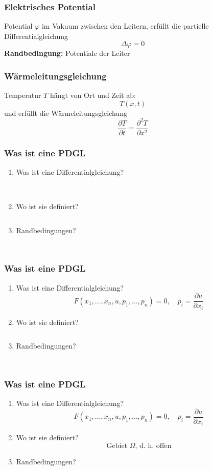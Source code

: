 \begin{frame}
\frametitle{Elektrisches Potential}
Potential 
$\varphi$ 
im Vakuum zwischen den Leitern,
\pause
erfüllt die partielle Differentialgleichung
\[
\Delta \varphi =0
\]
\pause
{\bf Randbedingung:} Potentiale der Leiter
\end{frame}

\begin{frame}
\frametitle{Wärmeleitungsgleichung}
Temperatur $T$ hängt von Ort und Zeit ab:
\[
T(x,t)
\]
\pause
und erfüllt die Wärmeleitungsgleichung
\[
\frac{\partial T}{\partial t}=\frac{\partial^2T}{\partial x^2}
\]
\end{frame}

\begin{frame}
\frametitle{Was ist eine PDGL}
\begin{enumerate}
\item Was ist eine Differentialgleichung?
\[
\phantom{
F( x_1,\dots,x_n,u,p_1, \dots,p_n) =0,\quad p_i=\frac{\partial u}{\partial x_i}
}
\]
\item Wo ist sie definiert?
\[
\phantom{
\text{Gebiet $\Omega$, d.~h.~offen}
}
\]
\item Randbedingungen?
\[
\phantom{
\text{$u(x)=g(x)$ oder $\frac{\partial u}{\partial n}=g(x)$ auf
$\partial\Omega$}
}
\]
\end{enumerate}
\end{frame}

\begin{frame}
\frametitle{Was ist eine PDGL}
\begin{enumerate}
\item Was ist eine Differentialgleichung?
\[
F( x_1,\dots,x_n,u,p_1, \dots,p_n) =0,\quad p_i=\frac{\partial u}{\partial x_i}
\]
\item Wo ist sie definiert?
\[
\phantom{
\text{Gebiet $\Omega$, d.~h.~offen}
}
\]
\item Randbedingungen?
\[
\phantom{
\text{$u(x)=g(x)$ oder $\frac{\partial u}{\partial n}=g(x)$ auf
$\partial\Omega$}
}
\]
\end{enumerate}
\end{frame}

\begin{frame}
\frametitle{Was ist eine PDGL}
\begin{enumerate}
\item Was ist eine Differentialgleichung?
\[
F( x_1,\dots,x_n,u,p_1, \dots,p_n) =0,\quad p_i=\frac{\partial u}{\partial x_i}
\]
\item Wo ist sie definiert?
\[
\text{Gebiet $\Omega$, d.~h.~offen}
\]
\item Randbedingungen?
\[
\phantom{
\text{$u(x)=g(x)$ oder $\frac{\partial u}{\partial n}=g(x)$ auf
$\partial\Omega$}
}
\]
\end{enumerate}
\end{frame}

